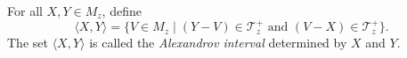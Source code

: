 For all $X, Y \in M_z$, define
$$\langle X, Y \rangle = \{ V \in M_z \mid (Y - V) \in \mathcal{T}_z^+ \text{ and } (V - X) \in \mathcal{T}_z^+ \}.$$
The set $\langle X, Y \rangle$ is called the \textit{Alexandrov interval} determined by $X$ and $Y$.
